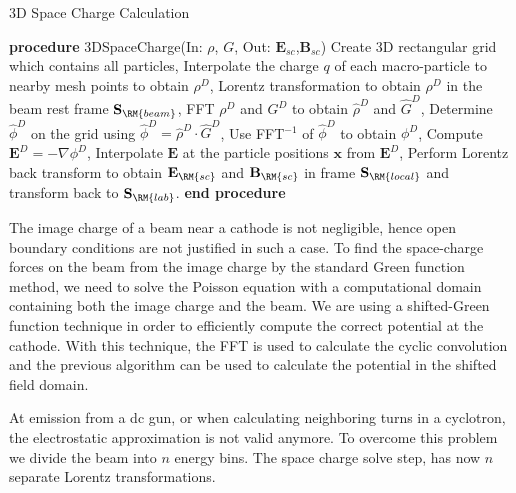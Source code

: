 \documentclass[acus]{JAC2003}
\newcommand{\bs}[1]{\mathbf #1}
\begin{document}
\begin{algorithm}
  \caption{3D Space Charge Calculation} 
  \label{alg1:sc3d}
  \begin{algorithmic}[1]
    \STATE \textbf{procedure} 3DSpaceCharge(In: $\rho$, $G$, Out: $\bs{E_{sc}}$,$\bs{B_{sc}}$)
       \STATE Create 3D rectangular grid which contains all particles, %
       \STATE Interpolate the charge $q$ of each macro-particle to nearby mesh points to obtain $\rho^D$, 
       \STATE Lorentz transformation to obtain $\rho^D$ in the beam rest frame $\bs{S}_{\RM{beam}}$,
       \STATE FFT $\rho^D$ and $G^D$ to obtain $\widehat{\rho}^D$ and $\widehat{G}^D$,
       \STATE Determine $\widehat{\phi}^D$ on the grid using $\widehat{\phi}^D = \widehat{\rho}^D \cdot \widehat{G}^D$,
       \STATE Use FFT$^{-1}$ of $\widehat{\phi }^D$ to obtain $\phi^D$,
       \STATE Compute $\bs{E}^D= -\nabla \phi^D$,
       \STATE Interpolate $\bs{E}$ at the particle positions $\bs{x}$ from $\bs{E}^D$,
       \STATE Perform Lorentz back transform to obtain $\bs{E_{\RM{sc}}}$ and $\bs{B_{\RM{sc}}}$ in  frame $\bs{S}_{\RM{local}}$ and transform back  to $\bs{S}_{\RM{lab}}$.
       \STATE \textbf{end procedure}
  \end{algorithmic}
\end{algorithm}

The image charge of a beam near a cathode is not negligible, hence
open boundary conditions are not justified in such a case. To find the space-charge forces on the beam from
the image charge by the standard Green function method,
we need to solve the Poisson equation with a computational
domain containing both the image charge and the beam.
We are using a shifted-Green function \cite{shgreen} technique in order to efficiently compute the correct potential at the cathode.
With this technique, the FFT is used to calculate the cyclic convolution
and the previous algorithm can be used to calculate the
potential in the shifted field domain.

At  emission from a dc gun, or when calculating neighboring turns in a cyclotron, the electrostatic approximation is not valid anymore. To overcome this problem
we divide the beam into $n$ energy bins. The space charge solve step, has now $n$ separate Lorentz transformations. 
\end{document}

